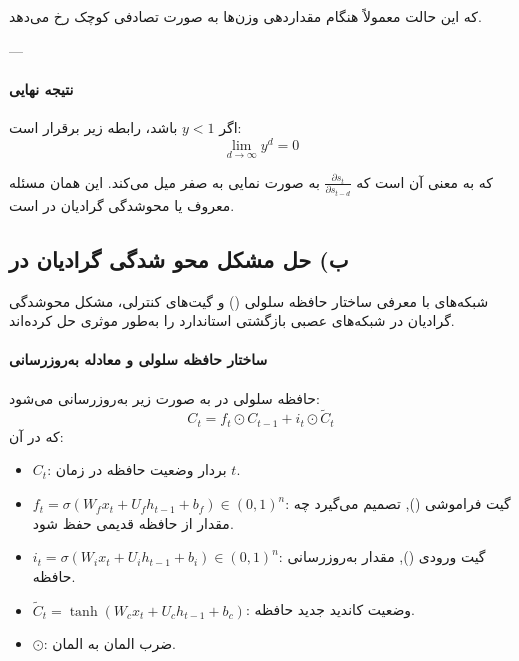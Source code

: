 \documentclass{article}
\begin{document}
که این حالت معمولاً هنگام مقداردهی وزن‌ها به صورت تصادفی کوچک رخ می‌دهد.

---

\paragraph{نتیجه نهایی}

اگر \(y < 1\) باشد، رابطه زیر برقرار است:
\begin{equation}
\lim_{d \to \infty} y^d = 0
\end{equation}

که به معنی آن است که \(\frac{\partial s_t}{\partial s_{t-d}}\) به صورت نمایی به صفر میل می‌کند. این همان مسئله معروف  یا محوشدگی گرادیان در  است.


\subsection{ب) حل مشکل محو شدگی گرادیان در }

شبکه‌های  با معرفی ساختار حافظه سلولی () و گیت‌های کنترلی، مشکل محوشدگی گرادیان در شبکه‌های عصبی بازگشتی استاندارد را به‌طور موثری حل کرده‌اند.

\medskip

\paragraph{ساختار حافظه سلولی و معادله به‌روزرسانی} 

حافظه سلولی در  به صورت زیر به‌روزرسانی می‌شود:
\begin{equation}
	C_t = f_t \odot C_{t-1} + i_t \odot \widetilde{C}_t
	\label{eq:lstm_cell_state}
\end{equation}
که در آن:
\begin{itemize}
	\item \(C_t\): بردار وضعیت حافظه در زمان \(t\).
	\item \(f_t = \sigma(W_f x_t + U_f h_{t-1} + b_f) \in (0,1)^n\): گیت فراموشی (), تصمیم می‌گیرد چه مقدار از حافظه قدیمی حفظ شود.
	\item \(i_t = \sigma(W_i x_t + U_i h_{t-1} + b_i) \in (0,1)^n\): گیت ورودی (), مقدار به‌روزرسانی حافظه.
	\item \(\widetilde{C}_t = \tanh(W_c x_t + U_c h_{t-1} + b_c)\): وضعیت کاندید جدید حافظه.
	\item \(\odot\): ضرب المان به المان.
\end{itemize}
\end{document}
